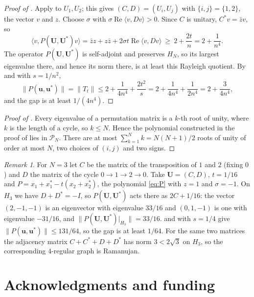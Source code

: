 \documentclass[11pt]{article}
\theoremstyle{remark}
\newtheorem{remark}[theorem]{Remark}
\begin{document}
\begin{proof}[Proof of ]
Apply  to $U_1,U_2$; this gives $(C,D)=(U_i,U_j)$ with $\{i,j\}=\{1,2\}$, the vector $v$ and $z$.
Choose $\sigma$ with $\sigma\operatorname{Re}\langle v,Dv\rangle>0$. Since $C$ is unitary, $C^*v=\bar zv$, so
\[
  \langle v,P(\mathbf U,\mathbf U^*)v\rangle=\bar z z+z\bar z+2\sigma t\operatorname{Re}\langle v,Dv\rangle
  \ \ge\ 2+\frac{2t}n=2+\frac1{n^4}.
\]
The operator $P(\mathbf U,\mathbf U^*)$ is self-adjoint and preserves $H_N$, so its largest eigenvalue there,
and hence its norm there, is at least this Rayleigh quotient. By  and  with $s=1/n^2$,
\[
  \|P(\mathbf u,\mathbf u^*)\|=\|T_t\|\le 2+\frac1{4n^4}+\frac{2t^2}{s}=2+\frac1{4n^4}+\frac1{2n^4}
  =2+\frac3{4n^4},
\]
and the gap is at least $1/(4n^4)$.
\end{proof}

\begin{proof}[Proof of ]
Every eigenvalue of a permutation matrix is a $k$-th root of unity, where $k$ is the length of a cycle, so $k\le N$.
Hence the polynomial constructed in the proof of  lies in $\mathcal P_N$. There are at most
$\sum_{k=1}^Nk=N(N+1)/2$ roots of unity of order at most $N$, two choices of $(i,j)$ and two signs.
\end{proof}

\begin{remark}\label{rem:example}
For $N=3$ let $C$ be the matrix of the transposition of $1$ and $2$ (fixing $0$) and $D$ the matrix of the
cycle $0\to1\to2\to0$. Take
$\mathbf U=(C,D)$, $t=1/16$ and $P=x_1+x_1^*-t(x_2+x_2^*)$, the polynomial \eqref{eq:P} with $z=1$ and $\sigma=-1$.
On $H_3$ we have $D+D^*=-I$, so $P(\mathbf U,\mathbf U^*)$ acts there as $2C+1/16$: the vector $(2,-1,-1)$ is an
eigenvector with eigenvalue $33/16$ and $(0,1,-1)$ is one with eigenvalue $-31/16$, and
$\|P(\mathbf U,\mathbf U^*)|_{H_3}\|=33/16$.  and  with $s=1/4$ give
$\|P(\mathbf u,\mathbf u^*)\|\le 131/64$, so the gap is at least $1/64$. For the same two matrices the
adjacency matrix $C+C^*+D+D^*$ has norm $3<2\sqrt3$ on $H_3$, so the corresponding $4$-regular graph is Ramanujan.
\end{remark}

\section*{Acknowledgments and funding}
\end{document}
